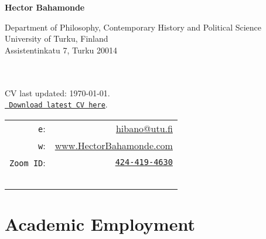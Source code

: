 \documentclass[letterpaper]{article}
\def\name{Hector Bahamonde}
\begin{document}
\centerline{\huge \bf \name}

\vspace{0.25in}

\begin{minipage}{0.45\linewidth}
 Department of Philosophy, Contemporary History and Political Science\\
 University of Turku, Finland\\
 Assistentinkatu 7, Turku 20014\\
  \\
  \\
\begin{footnotesize}
CV last updated: \today. \\
\href{http://github.com/hbahamonde/Job_Market/raw/master/Bahamonde_CV.pdf}{\texttt{{\color{red} Download latest CV here}}}.%
\end{footnotesize}

\end{minipage}
 \hspace{\fill}\begin{minipage}{0.35\linewidth}
  \begin{tabular}{rr}
    \texttt{e}: & \href{mailto:hibano@utu.fi}{hibano@utu.fi} \\
    \texttt{w}: & \href{http://www.hectorbahamonde.com}{www.HectorBahamonde.com}\\
    \texttt{Zoom ID}: & \href{https://utu.zoom.us/j/4244194630}{\texttt{424-419-4630}}\\
    \\
    \\
    \\
    \\
    \\
  \end{tabular}
\end{minipage}


{\unskip}


\section*{Academic Employment}
\end{document}
